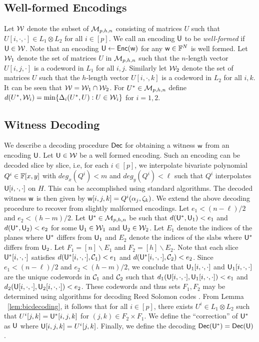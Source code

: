 \subsection{Well-formed Encodings}\label{sec:wellformedenc}
Let $\mathcal{W}$ denote the subset of $\mathcal{M}_{p,h,n}$
consisting of matrices $U$ such that $U[i,\cdot,\cdot]\in L_1\otimes L_2$ for all $i\in [p]$. 
We call an encoding $\mathsf{U}$ to be {\em well-formed} if $\mathsf{U}\in \mathcal{W}$. Note
that an encoding $\mathsf{U}\gets \mathsf{Enc}(\mathsf{w})$ for any $\mathsf{w}\in \mathbb{F}^N$ is well formed. 
Let $\mathcal{W}_1$ denote the set of matrices
$U$ in $\mathcal{M}_{p,h,n}$ such that the $n$-length vector $U[i,j,\cdot]$ is a
codeword in $L_1$ for all $i,j$. Similarly let $\mathcal{W}_2$ denote the set of
matrices $U$ such that the $h$-length vector $U[i,\cdot,k]$ is a codeword in
$L_2$ for all $i,k$. It can be seen that $\mathcal{W}=\mathcal{W}_1\cap \mathcal{W}_2$. For $U^\ast\in \mathcal{M}_{p,h,n}$ define
$d(U^\ast,\mathcal{W}_i)=\min\{\Delta_i(U^\ast,U):U\in \mathcal{W}_i\}$ for $i=1,2$.

\subsection{Witness Decoding}\label{sec:witdecoding}
We describe a decoding procedure $\mathsf{Dec}$ for obtaining a witness $\mathsf{w}$ from an encoding
$\mathsf{U}$. Let $\mathsf{U}\in \mathcal{W}$ be a well formed encoding. Such an encoding can
be decoded slice by slice, i.e, for each $i\in [p]$, we interpolate bivariate
polynomial $Q^i\in \mathbb{F}[x,y]$ with $deg_x(Q^i)<m$ and $deg_y(Q^i)<\ell$ such that
$Q^i$ interpolates $\mathsf{U}[i,\cdot,\cdot]$ on $H$. This can be accomplished using
standard algorithms. The decoded witness $\mathsf{w}$ is then given by
$\mathsf{w}[i,j,k]=Q^i(\alpha_j,\zeta_k)$. We extend the above decoding procedure to
recover from slightly malformed encodings. Let
$e_1<(n-\ell)/2$ and $e_2<(h-m)/2$. Let $\mathsf{U}^*\in \mathcal{M}_{p,h,n}$ be such
that $d(\mathsf{U}^*,\mathsf{U}_1)<e_1$ and $d(\mathsf{U}^*,\mathsf{U}_2)<e_2$ for some $\mathsf{U}_1\in
\mathcal{W}_1$ and $\mathsf{U}_2\in \mathcal{W}_2$. Let $E_1$ denote
the indices of the planes where $\mathsf{U}^*$ differs from $\mathsf{U}_1$ and 
$E_2$ denote the indices of the slabs where $\mathsf{U}^*$ differs from $\mathsf{U}_2$.
Let $F_1=[n]\backslash E_1$ and
$F_2=[h]\backslash E_2$. Note that each
slice $\mathsf{U}^*[i,\cdot,\cdot]$ satisfies
$d(\mathsf{U}^*[i,\cdot,\cdot],\mathcal{C}_1)<e_1$  and
$d(\mathsf{U}^*[i,\cdot,\cdot],\mathcal{C}_2)<e_2$. Since $e_1<(n-\ell)/2$ and
$e_2<(h-m)/2$, we conclude that $\mathsf{U}_1[i,\cdot,\cdot]$ and
$\mathsf{U}_1[i,\cdot,\cdot]$ are the unique codewords in $\mathcal{C}_1$ and $\mathcal{C}_2$
such that $d_1(\mathsf{U}[i,\cdot,\cdot],\mathsf{U}_1[i,\cdot,\cdot])<e_1$ and
$d_2(\mathsf{U}[i,\cdot,\cdot],\mathsf{U}_2[i,\cdot,\cdot])<e_2$. These codewords and thus
sets $F_1,F_2$ may be
determined using algorithms for decoding Reed Solomon codes \cite{CodingTheory}.
 From Lemma ~\ref{lem:bicdecoding}, it follows that for all $i\in [p]$, there exists $U^i\in L_1\otimes L_2$ such
that $U^i[j,k]=\mathsf{U}^*[i,j,k]$ for $(j,k)\in F_2\times F_1$. We define the
``correction'' of $\mathsf{U}^*$ as $\mathsf{U}$ where
$\mathsf{U}[i,j,k]=U^i[j,k]$. Finally, we define the decoding $\mathsf{Dec}(\mathsf{U}^*) =
\mathsf{Dec}(\mathsf{U})$.


